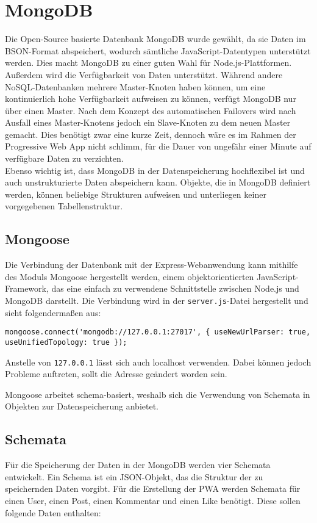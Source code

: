 \chapter{MongoDB}

Die Open-Source basierte Datenbank MongoDB wurde gewählt, da sie Daten im BSON-Format abspeichert, wodurch sämtliche JavaScript-Datentypen unterstützt werden. Dies macht MongoDB zu einer guten Wahl für Node.js-Plattformen. Außerdem wird die Verfügbarkeit von Daten unterstützt. Während andere NoSQL-Datenbanken mehrere Master-Knoten haben können, um eine kontinuierlich hohe Verfügbarkeit aufweisen zu können, verfügt MongoDB nur über einen Master. Nach dem Konzept des automatischen Failovers wird nach Ausfall eines Master-Knotens jedoch ein Slave-Knoten zu dem neuen Master gemacht. Dies benötigt zwar eine kurze Zeit, dennoch wäre es im Rahmen der Progressive Web App nicht schlimm, für die Dauer von ungefähr einer Minute auf verfügbare Daten zu verzichten. \\
Ebenso wichtig ist, dass MongoDB in der Datenspeicherung hochflexibel ist und auch unstrukturierte Daten abspeichern kann. Objekte, die in MongoDB definiert werden, können beliebige Strukturen aufweisen und unterliegen keiner vorgegebenen Tabellenstruktur.

\section{Mongoose}
Die Verbindung der Datenbank mit der Express-Webanwendung kann mithilfe des Moduls Mongoose hergestellt werden, einem objektorientierten JavaScript-Framework, das eine einfach zu verwendene Schnittstelle zwischen Node.js und MongoDB darstellt. Die Verbindung wird in der \texttt{server.js}-Datei hergestellt und sieht folgendermaßen aus:

\begin{lstlisting}[caption=Herstellen der Verbindung zu MongoDB, label=lst:url]
    mongoose.connect('mongodb://127.0.0.1:27017', { useNewUrlParser: true, useUnifiedTopology: true });
\end{lstlisting}

Anstelle von \texttt{127.0.0.1} lässt sich auch {localhost} verwenden. Dabei können jedoch Probleme auftreten, sollt die Adresse geändert worden sein.

Mongoose arbeitet schema-basiert, weshalb sich die Verwendung von Schemata in Objekten zur Datenspeicherung anbietet.

\section{Schemata}
Für die Speicherung der Daten in der MongoDB werden vier Schemata entwickelt. Ein Schema ist ein JSON-Objekt, das die Struktur der zu speichernden Daten vorgibt. Für die Erstellung der PWA werden Schemata für einen User, einen Post, einen Kommentar und einen Like benötigt. Diese sollen folgende Daten enthalten:


